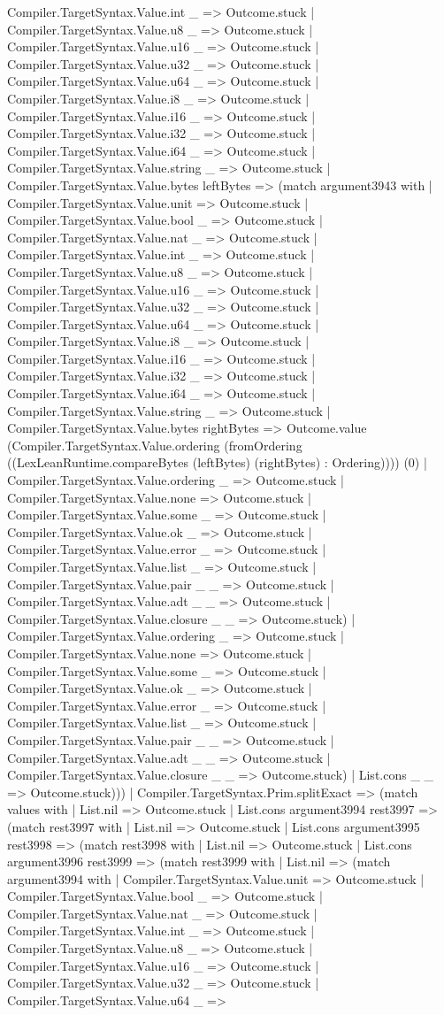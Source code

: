 \documentclass[11pt]{article}
\begin{document}
Compiler.TargetSyntax.Value.int \_ => Outcome.stuck | Compiler.TargetSyntax.Value.u8 \_ => Outcome.stuck | Compiler.TargetSyntax.Value.u16 \_ => Outcome.stuck | Compiler.TargetSyntax.Value.u32 \_ => Outcome.stuck | Compiler.TargetSyntax.Value.u64 \_ => Outcome.stuck | Compiler.TargetSyntax.Value.i8 \_ => Outcome.stuck | Compiler.TargetSyntax.Value.i16 \_ => Outcome.stuck | Compiler.TargetSyntax.Value.i32 \_ => Outcome.stuck | Compiler.TargetSyntax.Value.i64 \_ => Outcome.stuck | Compiler.TargetSyntax.Value.string \_ => Outcome.stuck | Compiler.TargetSyntax.Value.bytes leftBytes => (match argument3943 with | Compiler.TargetSyntax.Value.unit => Outcome.stuck | Compiler.TargetSyntax.Value.bool \_ => Outcome.stuck | Compiler.TargetSyntax.Value.nat \_ => Outcome.stuck | Compiler.TargetSyntax.Value.int \_ => Outcome.stuck | Compiler.TargetSyntax.Value.u8 \_ => Outcome.stuck | Compiler.TargetSyntax.Value.u16 \_ => Outcome.stuck | Compiler.TargetSyntax.Value.u32 \_ => Outcome.stuck | Compiler.TargetSyntax.Value.u64 \_ => Outcome.stuck | Compiler.TargetSyntax.Value.i8 \_ => Outcome.stuck | Compiler.TargetSyntax.Value.i16 \_ => Outcome.stuck | Compiler.TargetSyntax.Value.i32 \_ => Outcome.stuck | Compiler.TargetSyntax.Value.i64 \_ => Outcome.stuck | Compiler.TargetSyntax.Value.string \_ => Outcome.stuck | Compiler.TargetSyntax.Value.bytes rightBytes => Outcome.value (Compiler.TargetSyntax.Value.ordering (fromOrdering ((LexLeanRuntime.compareBytes (leftBytes) (rightBytes) : Ordering)))) (0) | Compiler.TargetSyntax.Value.ordering \_ => Outcome.stuck | Compiler.TargetSyntax.Value.none => Outcome.stuck | Compiler.TargetSyntax.Value.some \_ => Outcome.stuck | Compiler.TargetSyntax.Value.ok \_ => Outcome.stuck | Compiler.TargetSyntax.Value.error \_ => Outcome.stuck | Compiler.TargetSyntax.Value.list \_ => Outcome.stuck | Compiler.TargetSyntax.Value.pair \_ \_ => Outcome.stuck | Compiler.TargetSyntax.Value.adt \_ \_ => Outcome.stuck | Compiler.TargetSyntax.Value.closure \_ \_ => Outcome.stuck) | Compiler.TargetSyntax.Value.ordering \_ => Outcome.stuck | Compiler.TargetSyntax.Value.none => Outcome.stuck | Compiler.TargetSyntax.Value.some \_ => Outcome.stuck | Compiler.TargetSyntax.Value.ok \_ => Outcome.stuck | Compiler.TargetSyntax.Value.error \_ => Outcome.stuck | Compiler.TargetSyntax.Value.list \_ => Outcome.stuck | Compiler.TargetSyntax.Value.pair \_ \_ => Outcome.stuck | Compiler.TargetSyntax.Value.adt \_ \_ => Outcome.stuck | Compiler.TargetSyntax.Value.closure \_ \_ => Outcome.stuck) | List.cons \_ \_ => Outcome.stuck))) | Compiler.TargetSyntax.Prim.splitExact => (match values with | List.nil => Outcome.stuck | List.cons argument3994 rest3997 => (match rest3997 with | List.nil => Outcome.stuck | List.cons argument3995 rest3998 => (match rest3998 with | List.nil => Outcome.stuck | List.cons argument3996 rest3999 => (match rest3999 with | List.nil => (match argument3994 with | Compiler.TargetSyntax.Value.unit => Outcome.stuck | Compiler.TargetSyntax.Value.bool \_ => Outcome.stuck | Compiler.TargetSyntax.Value.nat \_ => Outcome.stuck | Compiler.TargetSyntax.Value.int \_ => Outcome.stuck | Compiler.TargetSyntax.Value.u8 \_ => Outcome.stuck | Compiler.TargetSyntax.Value.u16 \_ => Outcome.stuck | Compiler.TargetSyntax.Value.u32 \_ => Outcome.stuck | Compiler.TargetSyntax.Value.u64 \_ => 
\end{document}

